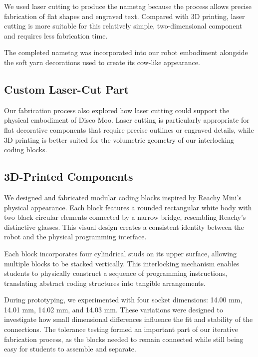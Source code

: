 \documentclass[conference]{IEEEtran}
\begin{document}
We used laser cutting to produce the nametag because the process allows precise fabrication of flat shapes and engraved text. Compared with 3D printing, laser cutting is more suitable for this relatively simple, two-dimensional component and requires less fabrication time.

The completed nametag was incorporated into our robot embodiment alongside the soft yarn decorations used to create its cow-like appearance.


\subsection{Custom Laser-Cut Part}

Our fabrication process also explored how laser cutting could support the physical embodiment of Disco Moo. Laser cutting is particularly appropriate for flat decorative components that require precise outlines or engraved details, while 3D printing is better suited for the volumetric geometry of our interlocking coding blocks.


\subsection{3D-Printed Components}

We designed and fabricated modular coding blocks inspired by Reachy Mini's physical appearance. Each block features a rounded rectangular white body with two black circular elements connected by a narrow bridge, resembling Reachy's distinctive glasses. This visual design creates a consistent identity between the robot and the physical programming interface.

Each block incorporates four cylindrical studs on its upper surface, allowing multiple blocks to be stacked vertically. This interlocking mechanism enables students to physically construct a sequence of programming instructions, translating abstract coding structures into tangible arrangements.

During prototyping, we experimented with four socket dimensions: 14.00 mm, 14.01 mm, 14.02 mm, and 14.03 mm. These variations were designed to investigate how small dimensional differences influence the fit and stability of the connections. The tolerance testing formed an important part of our iterative fabrication process, as the blocks needed to remain connected while still being easy for students to assemble and separate.
\end{document}
